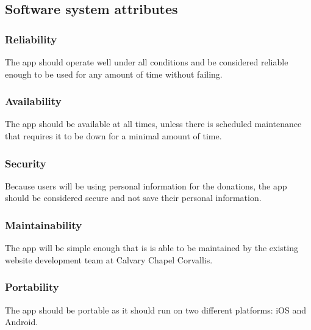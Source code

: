 \documentclass[letterpaper,10pt,draftclsnofoot,onecolumn,compsoc,titlepage]{IEEEtran}
\begin{document}
	\subsection{Software system attributes}
	\subsubsection{Reliability} The app should operate well under all conditions and be considered reliable enough to be used for any amount of time without failing.
	\subsubsection{Availability} The app should be available at all times, unless there is scheduled maintenance that requires it to be down for a minimal amount of time.
	\subsubsection{Security} Because users will be using personal information for the donations, the app should be considered secure and not save their personal information.
	\subsubsection{Maintainability} The app will be simple enough that is is able to be maintained by the existing website development team at Calvary Chapel Corvallis.
	\subsubsection{Portability} The app should be portable as it should run on two different platforms: iOS and Android.
\end{document}
